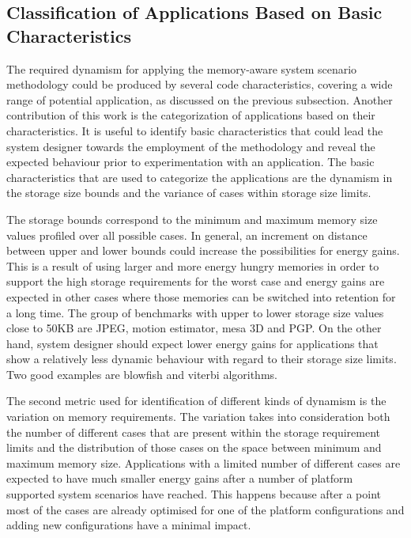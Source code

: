 \documentclass[a4paper,conference]{IEEEtran}
\begin{document}
\subsection{Classification of Applications Based on Basic Characteristics}
\label{sec:categorisation}
The required dynamism for applying the memory-aware system scenario methodology could be produced by several code characteristics, covering a wide range of potential application, as discussed on the previous subsection. Another contribution of this work is the categorization of applications based on their characteristics. It is useful to identify basic characteristics that could lead the system designer towards the employment of the methodology and reveal the expected behaviour prior to experimentation with an application. The basic characteristics that are used to categorize the applications are the dynamism in the storage size bounds and the variance of cases within storage size limits.

The storage bounds correspond to the minimum and maximum memory size values profiled over all possible cases. In general, an increment on distance between upper and lower bounds could increase the possibilities for energy gains. This is a result of using larger and more energy hungry memories in order to support the high storage requirements for the worst case and energy gains are expected in other cases where those memories can be switched into retention for a long time. The group of benchmarks with upper to lower storage size values close to 50KB are JPEG, motion estimator, mesa 3D and PGP. On the other hand, system designer should expect lower energy gains for applications that show a relatively less dynamic behaviour with regard to their storage size limits. Two good examples are blowfish and viterbi algorithms. 

The second metric used for identification of different kinds of dynamism is the variation on memory requirements. The variation takes into consideration both the number of different cases that are present within the storage requirement limits and the distribution of those cases on the space between minimum and maximum memory size. Applications with a limited number of different cases are expected to have much smaller energy gains after a number of platform supported system scenarios have reached. This happens because after a point most of the cases are already optimised for one of the platform configurations and adding new configurations have a minimal impact.
\end{document}
